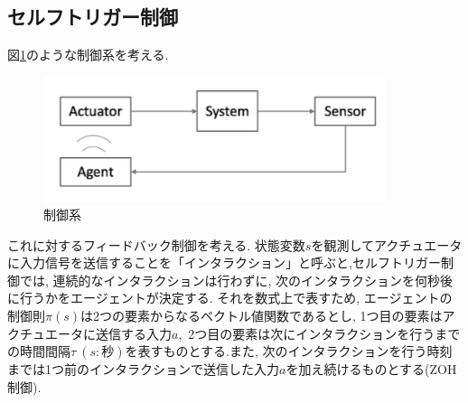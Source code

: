 \documentclass{jsarticle}
\begin{document}
\subsection{セルフトリガー制御}
図\ref{image}のような制御系を考える.
\begin{figure}[h]
	\centering
 	\includegraphics[width=10cm]{event.png}
 	\caption{制御系} \label{image}
\end{figure}\par
これに対するフィードバック制御を考える. 状態変数$s$を観測してアクチュエータに入力信号を送信することを「インタラクション」と呼ぶと,セルフトリガー制御では, 連続的なインタラクションは行わずに, 次のインタラクションを何秒後に行うかをエージェントが決定する. それを数式上で表すため, エージェントの制御則$\pi(s)$は2つの要素からなるベクトル値関数であるとし, 1つ目の要素はアクチュエータに送信する入力$a$,~2つ目の要素は次にインタラクションを行うまでの時間間隔$\tau~(s:秒)$を表すものとする.また, 次のインタラクションを行う時刻までは1つ前のインタラクションで送信した入力$a$を加え続けるものとする(ZOH制御).
\end{document}
